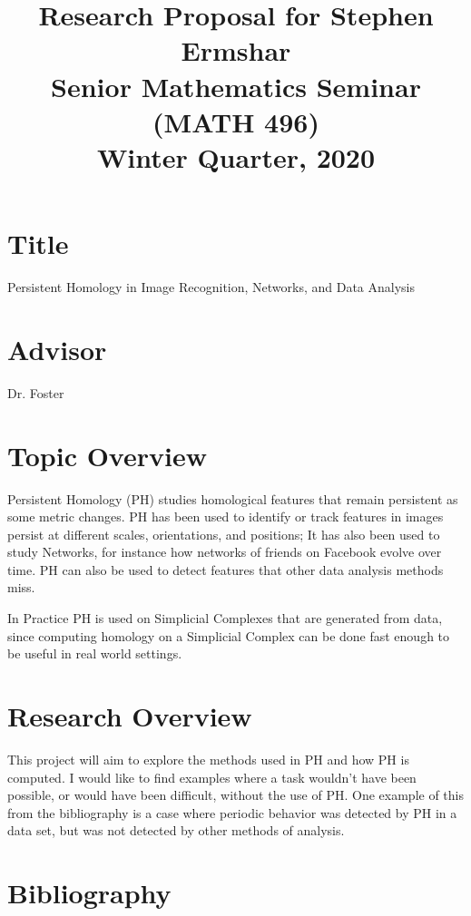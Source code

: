 \documentclass{article}
\title{
    \LARGE
    Research Proposal for Stephen Ermshar\\
    \large
    Senior Mathematics Seminar (MATH 496)\\
    Winter Quarter, 2020}
\date{}
\begin{document}
\maketitle

\section*{Title}\vspace{-1em}

Persistent Homology in Image Recognition, Networks, and Data Analysis

\section*{Advisor}\vspace{-1em}

Dr. Foster

\section*{Topic Overview}\vspace{-1em}

Persistent Homology (PH) studies homological features that remain persistent as some metric changes. PH has been used to identify or track features in images persist at different scales, orientations, and positions; It has also been used to study Networks, for instance how networks of friends on Facebook evolve over time. PH can also be used to detect features that other data analysis methods miss.

In Practice PH is used on Simplicial Complexes that are generated from data, since computing homology on a Simplicial Complex can be done fast enough to be useful in real world settings.

\section*{Research Overview}\vspace{-1em}
This project will aim to explore the methods used in PH and how PH is computed. I would like to find examples where a task wouldn't have been possible, or would have been difficult, without the use of PH. One example of this from the bibliography is a case where periodic behavior was detected by PH in a data set, but was not detected by other methods of analysis.
\newpage

\section*{Bibliography}
\end{document}
